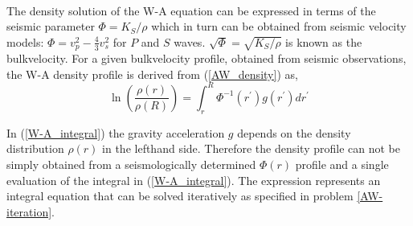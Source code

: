 
\vspace{0.5cm}

~\\
The density solution of the W-A equation can be expressed in terms
of the seismic parameter $\Phi = K_S/\rho$ which in turn can be obtained
from seismic velocity models:
$\Phi = v_p^2 - \frac{4}{3} v_s^2$ for $P$ and $S$ waves.
$\sqrt{\Phi}= \sqrt{K_S/\rho}$ is known as the bulkvelocity.
For a given bulkvelocity profile, 
obtained from seismic observations,
the W-A density profile is derived from
(\ref{AW_density}) as,
\begin{equation}
     \ln \left (  \frac{\rho(r)}{\rho(R)} \right ) = 
        \int_r^R \Phi^{-1}(r^{'}) g(r^{'}) dr^{'}
\label{W-A_integral}
\end{equation}


\vspace{0.5cm}

In (\ref{W-A_integral}) the gravity acceleration $g$ depends on
the density distribution $\rho(r)$ in the lefthand side.
Therefore the density profile can not be simply obtained from 
a seismologically determined $\Phi(r)$ profile and a single 
evaluation of the integral in (\ref{W-A_integral}).
The expression represents an integral equation that can be solved
iteratively as specified in problem \ref{AW-iteration}.

